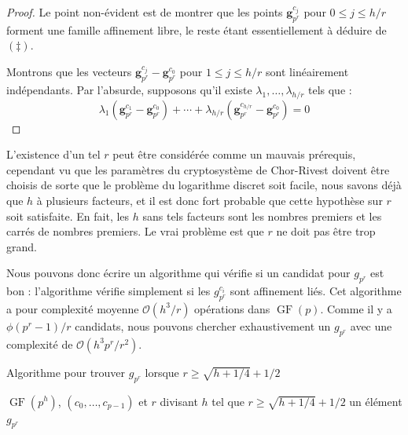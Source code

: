 \documentclass[a4paper, titlepage, 11pt]{article}
\theoremstyle{definition}
\theoremstyle{remark}
\def\O{\mathcal O}
\def\gf{\operatorname{GF}}
\def\mbf#1{\mathbf{#1}}
\begin{document}
\begin{proof}
Le point non-évident est de montrer que les points $\mbf g_{p^r}^{c_j}$ pour $0\leqslant j \leqslant h/r$ forment une famille affinement libre, le reste étant essentiellement à déduire de $(\ddagger)$.

Montrons que les vecteurs $\mbf g_{p^r}^{c_j} - \mbf g_{p^r}^{c_0}$ pour $1\leqslant j \leqslant h/r$ sont linéairement indépendants. Par l'absurde, supposons qu'il existe $\lambda_1, \dots, \lambda_{h/r}$ tels que :
$$\lambda_1 \left(\mbf g_{p^r}^{c_1} - \mbf g_{p^r}^{c_0}\right) + \cdots +
\lambda_{h/r} \left(\mbf g_{p^r}^{c_{h/r}} - \mbf g_{p^r}^{c_0}\right) = 0$$
\end{proof}

L'existence d'un tel $r$ peut être considérée comme un mauvais prérequis, cependant vu que les paramètres du cryptosystème de Chor-Rivest doivent être choisis de sorte que le problème du logarithme discret soit facile, nous savons déjà que $h$ à plusieurs facteurs, et il est donc fort probable que cette hypothèse sur $r$ soit satisfaite. En fait, les $h$ sans tels facteurs sont les nombres premiers et les carrés de nombres premiers. Le vrai problème est que $r$ ne doit pas être trop grand.

Nous pouvons donc écrire un algorithme qui vérifie si un candidat pour $g_{p^r}$ est bon : l'algorithme vérifie simplement si les $g_{p^r}^{c_i}$ sont affinement liés. Cet algorithme a pour complexité moyenne $\O(h^3/r)$ opérations dans $\gf(p)$. Comme il y a $\phi(p^r-1)/r$ candidats, nous pouvons chercher exhaustivement un $g_{p^r}$ avec une complexité de $\O(h^3p^r/r^2)$.

\begin{algorithm}[h]
\caption{Algorithme pour trouver $g_{p^r}$ lorsque $r\geqslant \sqrt{h + 1/4} + 1/2$}
\label{algoTestgpr}
\begin{algorithmic}[1]
\REQUIRE $\gf(p^h)$, $(c_0,\dots, c_{p-1})$ et $r$ divisant $h$ tel que $r\geqslant \sqrt{h + 1/4} + 1/2$
\ENSURE un élément $g_{p^r}$
\FORALL{$\zeta \in \gf(p^h)$ générateur de $\gf(p^r)^\times$} \label{algoTestgprboucle}
		\ENDIF
	\ENDFOR
	\RETURN{$\zeta$}
\ENDFOR
\end{algorithmic}
\end{algorithm}
\end{document}
